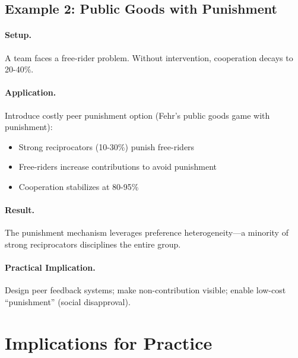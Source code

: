 \subsection{Example 2: Public Goods with Punishment}

\paragraph{Setup.} A team faces a free-rider problem. Without intervention,
cooperation decays to 20-40\%.

\paragraph{Application.} Introduce costly peer punishment option (Fehr's
public goods game with punishment):
\begin{itemize}[nosep]
    \item Strong reciprocators (10-30\%) punish free-riders
    \item Free-riders increase contributions to avoid punishment
    \item Cooperation stabilizes at 80-95\%
\end{itemize}

\paragraph{Result.} The punishment mechanism leverages preference heterogeneity---a
minority of strong reciprocators disciplines the entire group.

\paragraph{Practical Implication.} Design peer feedback systems; make non-contribution
visible; enable low-cost ``punishment'' (social disapproval).


\section{Implications for Practice}
\label{sec:feh-practice}

